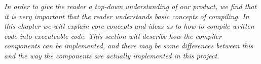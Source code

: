 \textit{In order to give the reader a top-down understanding of our product, we find that it is very important that the reader understands basic concepts of compiling. In this chapter we will explain core concepts and ideas as to how to compile written code into executeable code. This section will describe how the compiler components can be implemented, and there may be some differences between this and the way the components are actually implemented in this project.} \\ \\
